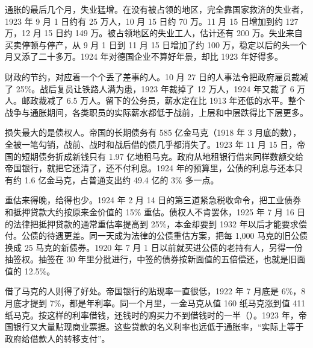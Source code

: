 通胀的最后几个月，失业猛增。在没有被占领的地区，完全靠国家救济的失业者，1923 年 9 月 1 日约有 25 万人，10 月 15 日约 70 万。11 月 15 日增加到约 127 万，12 月 15 日约 149 万。被占领地区的失业工人，估计还有 200 万\cite{bresciani1937}。失业来自买卖停顿与停产，从 9 月 1 日到 11 月 15 日增加了约 100 万，稳定以后的头一个月又添了二十多万。1924 年对德国企业不算好年景，却比 1923 年好得多\cite{sargent1982}。

财政的节约，对应着一个个丢了差事的人。10 月 27 日的人事法令把政府雇员裁减了 25\%。战后复员让铁路人满为患，1923 年裁掉了 12 万人，1924 年又裁了 6 万人。邮政裁减了 6.5 万人\cite{sargent1982}。留下的公务员，薪水定在比 1913 年还低的水平\cite{luther1987}。整个战争与通胀期间，各类职员的实际薪水都低于战前，上层和中层跌得比下层更多\cite{bresciani1937}。

损失最大的是债权人。帝国的长期债务有 585 亿金马克（1918 年 3 月底的数），全被一笔勾销，战前、战时和战后借的债几乎都消失了\cite{bresciani1937}。1923 年 11 月 15 日，帝国的短期债务折成新钱只有 1.97 亿地租马克。政府从地租银行借来同样数额交给帝国银行，就把它还清了，还不付利息\cite{bresciani1937}。1924 年的预算里，公债的利息与还本只有约 1.6 亿金马克，占普通支出约 49.4 亿的 3\% 多一点\cite{bresciani1937}。

重估来得晚，给得也少。1924 年 2 月 14 日的第三道紧急税收命令，把工业债券和抵押贷款大约按原来金价值的 15\% 重估。债权人不肯罢休，1925 年 7 月 16 日的法律把抵押贷款的通常重估率提高到 25\%，本金却要到 1932 年以后才能要求偿付\cite{bresciani1937}。公债的待遇更差。同一天成为法律的公债重估方案，把每 1,000 马克的旧公债换成 25 马克的新债券。1920 年 7 月 1 日以前就买进公债的老持有人，另得一份抽签权。抽签在 30 年里分批进行，中签的债券按新面值的五倍偿还，也就是旧面值的 12.5\%\cite{bresciani1937}。

借了马克的人则得了好处。帝国银行的贴现率一直很低，1922 年 7 月底是 6\%，8 月底才提到 7\%，都是年利率。同一个月里，一金马克从值 160 纸马克涨到值 411 纸马克\cite{bresciani1937}。按这样的利率借钱，还钱时的购买力不到借钱时的一半（）。1923 年，帝国银行又大量贴现商业票据。这些贷款的名义利率也远低于通胀率，“实际上等于政府给借款人的转移支付”\cite{sargent1982}。

